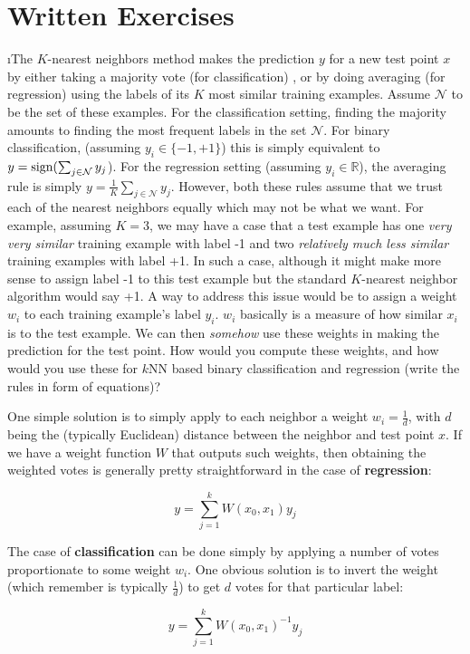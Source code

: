 \documentclass[fleqn]{article}
\begin{document}


\section{Written Exercises}

\bee

\i The $K$-nearest neighbors method makes the prediction $y$ for a new
test point $x$ by either taking a majority vote (for classification) 
, or by doing averaging (for regression) using the labels of its
$K$ most similar training examples. Assume $\mathcal{N}$  to be the 
set of these examples. For the classification setting, finding the majority 
amounts to finding the most frequent labels in the set $\mathcal{N}$. For 
binary classification, (assuming $y_i \in \{-1,+1\}$) this is simply 
equivalent to $y = \textrm{sign}(\sum_{j \in \mathcal{N}} y_j$). For the regression 
setting (assuming $y_i \in \mathbb{R}$), the averaging rule is simply 
$y = \frac{1}{K}\sum_{j \in \mathcal{N}} y_j$.  However, both these rules 
assume that we trust each of the nearest neighbors equally which may not be 
what we want. For example, assuming $K = 3$, we may have a case that a test 
example has one \textit{very very similar} training example with label -1 
and two \textit{relatively much less similar} training examples with label +1. 
In such a case, although it might make more sense to assign label -1 to 
this test example but the standard $K$-nearest neighbor algorithm would say +1.
A way to address this issue would be to assign a weight $w_i$ to each 
training example's label $y_i$. $w_i$ basically is a measure of how similar
$x_i$ is to the test example. We can then \textit{somehow} use these weights 
in making the prediction for the test point. How would you compute these weights, 
and how would you use these for $k$NN based binary classification and regression 
(write the rules in form of equations)?

\begin{solution}
One simple solution is to simply apply to each neighbor a weight $w_i = \frac{1}{d}$, with $d$ being the (typically Euclidean) distance between the neighbor and test point $x$. If we have a weight function $W$ that outputs such weights, then obtaining the weighted votes is generally pretty straightforward in the case of \textbf{regression}:

\begin{equation}
y = \sum_{j = 1}^k W(x_0, x_1) y_j
\end{equation}

The case of \textbf{classification} can be done simply by applying a number of votes proportionate to some weight $w_i$. One obvious solution is to invert the weight (which remember is typically $\frac{1}{d}$) to get $d$ votes for that particular label:

\begin{equation}
y = \sum_{j = 1}^k W(x_0, x_1)^{-1} y_j
\end{equation}

\end{solution}
\end{document}
